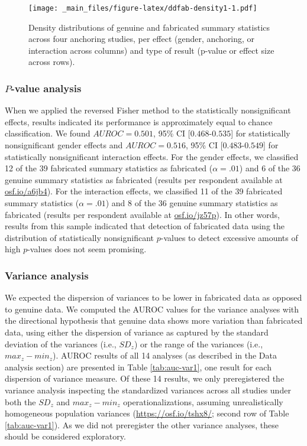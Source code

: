 \documentclass[a5paper]{book}
\begin{document}
\begin{figure}
\centering
\texttt{[image: \_main\_files/figure-latex/ddfab-density1-1.pdf]}
\caption{\label{fig:ddfab-density1}Density distributions of genuine and
fabricated summary statistics across four anchoring studies, per effect
(gender, anchoring, or interaction across columns) and type of result
(p-value or effect size across rows).}
\end{figure}

\subsubsection{\texorpdfstring{\(P\)-value
analysis}{P-value analysis}}\label{p-value-analysis-1}

When we applied the reversed Fisher method to the statistically
nonsignificant effects, results indicated its performance is
approximately equal to chance classification. We found \(AUROC=0.501\),
95\% CI {[}\(0.468\)-\(0.535\){]} for statistically nonsignificant
gender effects and \(AUROC=0.516\), 95\% CI {[}\(0.483\)-\(0.549\){]}
for statistically nonsignificant interaction effects. For the gender
effects, we classified 12 of the 39 fabricated summary statistics as
fabricated (\(\alpha=.01\)) and 6 of the 36 genuine summary statistics
as fabricated (results per respondent available at
\href{https://osf.io/a6jb4}{osf.io/a6jb4}). For the interaction effects,
we classified 11 of the 39 fabricated summary statistics
(\(\alpha=.01\)) and 8 of the 36 genuine summary statistics as
fabricated (results per respondent available at
\href{https://osf.io/jz57p}{osf.io/jz57p}). In other words, results from
this sample indicated that detection of fabricated data using the
distribution of statistically nonsignificant \(p\)-values to detect
excessive amounts of high \(p\)-values does not seem promising.

\subsubsection{Variance analysis}\label{variance-analysis-1}

We expected the dispersion of variances to be lower in fabricated data
as opposed to genuine data. We computed the AUROC values for the
variance analyses with the directional hypothesis that genuine data
shows more variation than fabricated data, using either the dispersion
of variance as captured by the standard deviation of the variances
(i.e., \(SD_z\)) or the range of the variances (i.e., \(max_z-min_z\)).
AUROC results of all 14 analyses (as described in the Data analysis
section) are presented in Table \ref{tab:auc-var1}, one result for each
dispersion of variance measure. Of these 14 results, we only
preregistered the variance analysis inspecting the standardized
variances across all studies under both the \(SD_z\) and \(max_z-min_z\)
operationalizations, assuming unrealistically homogeneous population
variances (\url{https://osf.io/tshx8/}; second row of Table
\ref{tab:auc-var1}). As we did not preregister the other variance
analyses, these should be considered exploratory.
\end{document}
